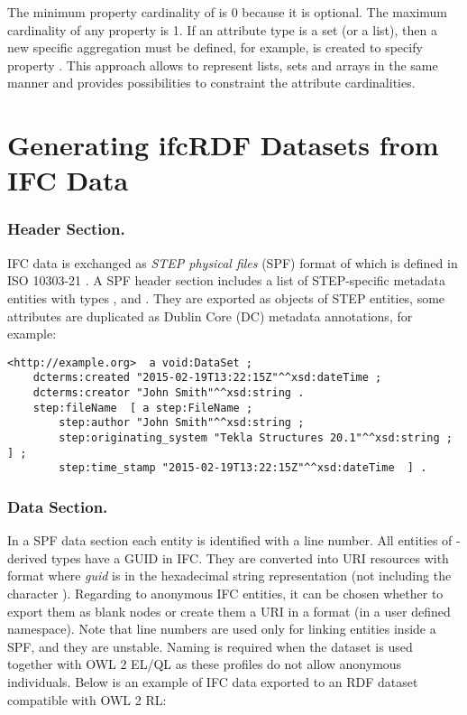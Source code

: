 The minimum property cardinality of  is 0 because it is optional. The maximum cardinality of any property is 1. If an attribute type is a set (or a list), then a new specific aggregation must be defined, for example,  is created to specify property . This approach allows to represent lists, sets and arrays in the same manner and provides possibilities to constraint the attribute cardinalities.



\section{Generating ifcRDF Datasets from IFC Data}
\label{sec:ifcRDF}

\subsubsection{Header Section.} IFC data is exchanged as \emph{STEP physical files} (SPF) format of which is defined in ISO 10303-21 \cite{ISO10303-21}. A SPF header section includes a list of STEP-specific metadata entities with types ,  and . %
They are exported as objects of STEP entities, some attributes are duplicated as Dublin Core (DC) metadata annotations, for example:

\begin{lstlisting}
<http://example.org>  a void:DataSet ;
    dcterms:created "2015-02-19T13:22:15Z"^^xsd:dateTime ;
    dcterms:creator "John Smith"^^xsd:string .
    step:fileName  [ a step:FileName ;
        step:author "John Smith"^^xsd:string ;
        step:originating_system "Tekla Structures 20.1"^^xsd:string ; ] ;
        step:time_stamp "2015-02-19T13:22:15Z"^^xsd:dateTime  ] .
\end{lstlisting}


\subsubsection{Data Section.} In a SPF data section each entity is identified with a line number.
All entities of -derived types have a GUID in IFC. They are converted into URI resources with format  where \emph{guid} is in the hexadecimal string representation (not including the character \name{\$}). Regarding to anonymous IFC entities, it can be chosen whether to export them as blank nodes or create them a URI in a format  (in a user defined namespace). Note that line numbers are used only for linking entities inside a SPF, and they are unstable. Naming is required when the dataset is used together with OWL 2 EL/QL as these profiles do not allow anonymous individuals. Below is an example of IFC data exported to an RDF dataset compatible with OWL 2 RL:

